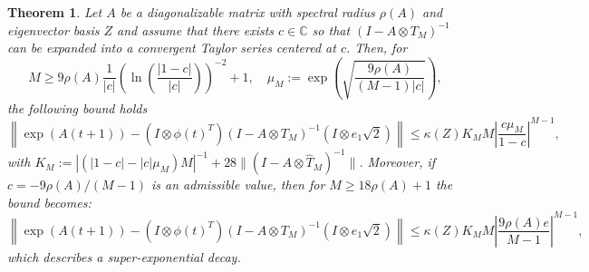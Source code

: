 \documentclass[final,1p,times,number]{elsarticle}
\theoremstyle{plain}%
\newtheorem{thm}{Theorem}[section]
\begin{document}
\begin{thm}\label{thm:bound}
Let $A$ be a diagonalizable matrix with spectral radius $\rho(A)$ and eigenvector basis $Z$ and
assume that there exists $c \in \mathbb{C}$ so that \((I-A\otimes T_{M})^{-1}\) can be expanded into a convergent Taylor series centered at $c$. Then, for %
\[M  \geq 9\rho(A) \frac{1}{|c|}\left(\ln\left(\frac{|1-c|}{|c|}\right)\right)^{-2} + 1, \quad \mu_{M} :=\exp\left(\sqrt{\frac{9\rho(A)}{(M-1)|c|}}\right),\]
the following bound holds
\[ \left\| \exp(A(t+1)) - (I \otimes \phi(t)^T)(I-A \otimes T_{M})^{-1}(I \otimes e_1 \sqrt{2})  \right\| \leq \kappa(Z) K_M M \left| \frac{c\mu_{M}}{1-c} \right|^{M-1},  \]
with \( K_M :=\left| (|1-c|-|c|\mu_{M})M \right|^{-1} + 28 \| (I- A \otimes \hat{T}_M)^{-1} \| \). Moreover, if \(c = - 9 \rho(A)/(M-1)\) is an admissible value, then for \(M \geq 18 \rho(A)+1\) the bound becomes:
\[ \left\| \exp(A(t+1)) - (I \otimes \phi(t)^T)(I-A \otimes T_{M})^{-1}(I \otimes e_1 \sqrt{2})  \right\| \leq \kappa(Z) K_M M \left| \frac{9\rho(A)e}{M-1} \right|^{M-1},   \]
which describes a super-exponential decay.
\end{thm}
\end{document}
